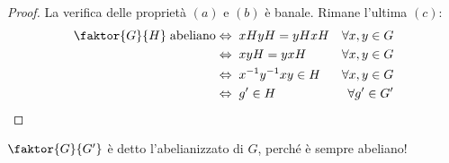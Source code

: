 \begin{multicols}{2}
\begin{enumerate}
\begin{proof}
	La verifica delle proprietà $ (a) $ e $ (b) $ è banale. Rimane l'ultima $ (c) $:
	\begin{align*}
	\faktor{G}{H} \;\text{abeliano} & \Leftrightarrow\; xHyH = yHxH &\forall x, y \in G \\
	& \Leftrightarrow\; xyH = yxH &\forall x, y \in G\\
	& \Leftrightarrow\; x^{-1}y^{-1}xy \in H &\forall x, y \in G\\
	& \Leftrightarrow\; g' \in H &\forall g' \in G'
	\end{align*}
\end{proof}
\begin{definition}
	$ \faktor{G}{G'} $ è detto l'abelianizzato di $ G $, perché è sempre abeliano!
\end{definition}
\end{enumerate}
\end{multicols}

